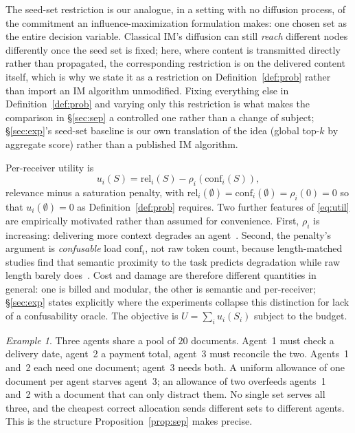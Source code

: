 \documentclass[sigconf,anonymous]{aamas}
\theoremstyle{remark}
\newtheorem{example}{Example}
\begin{document}
The seed-set restriction is our analogue, in a setting with no
diffusion process, of the commitment an influence-maximization
formulation makes: one chosen set as the entire decision variable.
Classical IM's diffusion can still \emph{reach} different nodes
differently once the seed set is fixed; here, where content is
transmitted directly rather than propagated, the corresponding
restriction is on the delivered content itself, which is why we state
it as a restriction on Definition~\ref{def:prob} rather than import an
IM algorithm unmodified. Fixing everything else in
Definition~\ref{def:prob} and varying only this restriction is what
makes the comparison in \S\ref{sec:sep} a controlled one rather than a
change of subject; \S\ref{sec:exp}'s seed-set baseline is our own
translation of the idea (global top-$k$ by aggregate score) rather
than a published IM algorithm.

Per-receiver utility is
\begin{equation}
u_i(S) = \mathrm{rel}_i(S) - \rho_i\!\left(\mathrm{conf}_i(S)\right),
\label{eq:util}
\end{equation}
relevance minus a saturation penalty, with
$\mathrm{rel}_i(\emptyset)=\mathrm{conf}_i(\emptyset)=\rho_i(0)=0$ so
that $u_i(\emptyset)=0$ as Definition~\ref{def:prob} requires. Two
further features of \eqref{eq:util} are empirically motivated rather
than assumed for convenience. First, $\rho_i$ is increasing: delivering
more context degrades an agent~\cite{distracted2025,nolima2025}.
Second, the penalty's argument is \emph{confusable} load
$\mathrm{conf}_i$, not raw token count, because length-matched studies
find that semantic proximity to the task predicts degradation while raw
length barely does~\cite{liu2024}. Cost and damage are therefore
different quantities in general: one is billed and modular, the other
is semantic and per-receiver; \S\ref{sec:exp} states explicitly where
the experiments collapse this distinction for lack of a confusability
oracle. The objective is $U = \sum_i u_i(S_i)$ subject to the budget.

\begin{example}
Three agents share a pool of $20$ documents. Agent~1 must check a
delivery date, agent~2 a payment total, agent~3 must reconcile the
two. Agents~1 and~2 each need one document; agent~3 needs both. A
uniform allowance of one document per agent starves agent~3; an
allowance of two overfeeds agents~1 and~2 with a document that can
only distract them. No single set serves all three, and the cheapest
correct allocation sends different sets to different agents. This is
the structure Proposition~\ref{prop:sep} makes precise.
\end{example}
\end{document}

